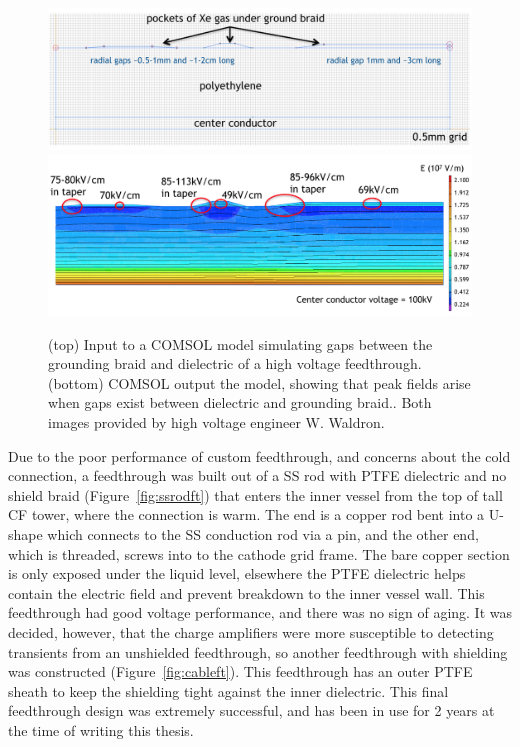 \begin{figure}[htbp]
\begin{center}
\includegraphics[width=\textwidth]{figures/testbed/will_comsol_1.png}\\
\includegraphics[width=\textwidth]{figures/testbed/will_comsol_2.png}

\caption{(top) Input to a COMSOL model simulating gaps between the grounding braid and dielectric of a high voltage feedthrough. (bottom) COMSOL output the model, showing that peak fields arise when gaps exist between dielectric and grounding braid.. Both images provided by high voltage engineer W. Waldron.}
\label{fig:will_comsol}
\end{center}
\end{figure}

Due to the poor performance of custom feedthrough, and concerns about the cold connection, a feedthrough was built out of a \ac{SS} rod with \ac{PTFE} dielectric and no shield braid (Figure~\ref{fig:ssrodft}) that enters the inner vessel from the top of tall CF tower, where the connection is warm. The end is a copper rod bent into a U-shape which connects to the \ac{SS} conduction rod via a pin, and the other end, which is threaded, screws into to the cathode grid frame. The bare copper section is only exposed under the liquid level, elsewhere the \ac{PTFE} dielectric helps contain the electric field and prevent breakdown to the inner vessel wall. This feedthrough had good voltage performance, and there was no sign of aging. It was decided, however, that the charge amplifiers were more susceptible to detecting transients from an unshielded feedthrough, so another feedthrough with shielding was constructed (Figure~\ref{fig:cableft}). This feedthrough has an outer PTFE sheath to keep the shielding tight against the inner dielectric. This final feedthrough design was extremely successful, and has been in use for 2 years at the time of writing this thesis.  

